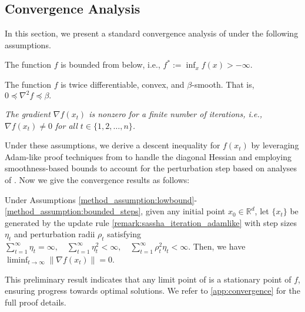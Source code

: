 \subsection{Convergence Analysis}
In this section, we present a standard convergence analysis of \sassha under the following assumptions.
\begin{assumption} \label{method_assumption:lowbound}
    The function $ f $ is bounded from below, i.e., \( f^* := \inf_x f(x) > -\infty \).
\end{assumption}
\begin{assumption} \label{method_assumption:smooth}
    The function $ f $ is twice differentiable, convex, and $\beta$-smooth. That is, $0\preceq \nabla^2f \preceq \beta.$
\end{assumption}
\begin{assumption}    
    \label{method_assumption:bounded_steps}
    \textit{The gradient \( \nabla f(x_t) \) is nonzero for a finite number of iterations, i.e., \( \nabla f(x_t) \neq 0 \) for all \( t \in \{1, 2, \dots, n\} \).}
\end{assumption}
Under these assumptions, we derive a descent inequality for $f(x_t)$ by leveraging Adam-like proof techniques from \citet{li2023convergence} to handle the diagonal Hessian and employing smoothness-based bounds to account for the perturbation step based on analyses of \citet{khanh2024fundamental}.
Now we give the convergence results as follows:
\begin{theorem}
    \label{thm:method_theorem}
    Under Assumptions \ref{method_assumption:lowbound}-\ref{method_assumption:bounded_steps}, given any initial point $x_0 \in \mathbb{R}^d$, let $\{x_t\}$ be generated by the update rule \sassha \cref{remark:sassha_iteration_adamlike} with step sizes \( \eta_t \) and perturbation radii \( \rho_t \) satisfying  
    $
        \sum_{t=1}^{\infty} \eta_t = \infty, \quad \sum_{t=1}^{\infty} \eta_t^2 < \infty, \quad \sum_{t=1}^{\infty} \rho_t^2 \eta_t < \infty
    $. 
    Then, we have $\liminf_{t \to \infty} \|\nabla f(x_t)\| = 0$.
\end{theorem}
This preliminary result indicates that any limit point of \sassha is a stationary point of $f$, ensuring progress towards optimal solutions.
We refer to \cref{app:convergence} for the full proof details.
